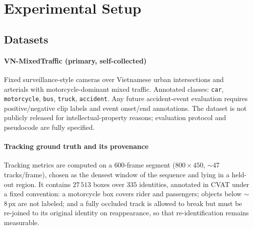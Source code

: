 
\section{Experimental Setup}
\label{sec:experiments}

\subsection{Datasets}
\label{subsec:datasets}

\paragraph{VN-MixedTraffic (primary, self-collected)}
Fixed surveillance-style cameras over Vietnamese urban intersections
and arterials with motorcycle-dominant mixed traffic.
Annotated classes: \texttt{car}, \texttt{motorcycle}, \texttt{bus},
\texttt{truck}, \texttt{accident}. Any future accident-event evaluation requires
positive/negative clip labels and event onset/end annotations.
The dataset is not publicly released for intellectual-property
reasons; evaluation protocol and pseudocode are fully specified.

\paragraph{Tracking ground truth and its provenance}
Tracking metrics are computed on a $600$-frame segment
($800\times450$, $\sim$47 tracks/frame), chosen as the densest window of
the sequence and lying in a held-out region.
It contains $27\,513$ boxes over $335$ identities, annotated in CVAT
under a fixed convention: a motorcycle box covers rider and passengers;
objects below $\sim$8\,px are not labeled; and a fully occluded track is
allowed to break but must be re-joined to its original identity on
reappearance, so that re-identification remains measurable.

